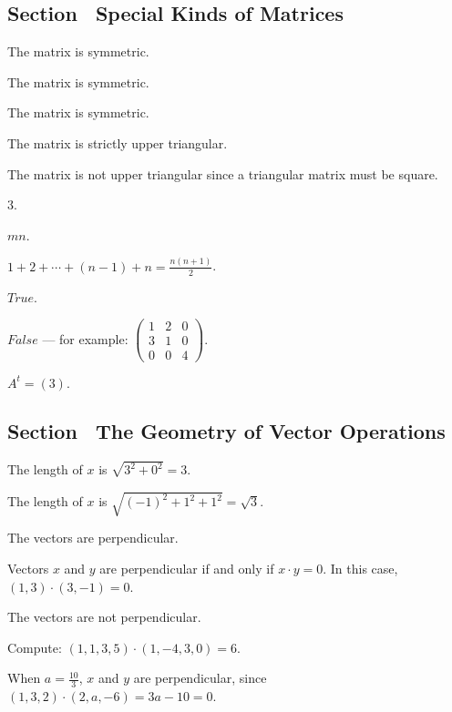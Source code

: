 \documentclass{ximera}
\begin{document}
\newpage
\subsection*{Section~\protect{\ref{S:1.3}} Special Kinds of Matrices}

 The matrix is symmetric.

 The matrix is symmetric.

 The matrix is symmetric.

 The matrix is strictly upper triangular.

 The matrix is not upper triangular since a triangular
matrix must be square.

 $3$.

 $mn$.

 $1 + 2 + \cdots + (n-1) + n = \frac{n(n + 1)}{2}$.

 $True$.

 $False$ --- for example:
$\left(\begin{array}{ccc}
1 & 2 & 0 \\
3 & 1 & 0 \\
0 & 0 & 4
\end{array}\right)$.

 \ans $A^t = (3).$



\subsection*{Section~\protect{\ref{S:1.4}} The Geometry of Vector Operations}

 \ans The length of $x$ is $\sqrt{3^2 + 0^2} = 3$.

 \ans The length of $x$ is $\sqrt{(-1)^2 + 1^2 + 1^2} =
\sqrt{3}$.

 \ans The vectors are perpendicular.

\soln Vectors $x$ and $y$ are perpendicular if and only if $x \cdot y = 0$.
In this case, $(1,3) \cdot (3,-1) = 0$.

 \ans The vectors are not perpendicular.

\soln Compute: $(1,1,3,5) \cdot (1,-4,3,0) = 6$.

When $a = \frac{10}{3}$, $x$ and $y$ are perpendicular, since
$(1,3,2) \cdot (2,a,-6) = 3a - 10 = 0$.
\end{document}
